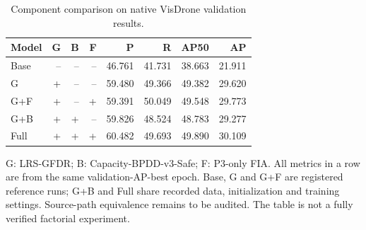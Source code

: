 \begin{table}[t]
\centering
\small
\setlength{\tabcolsep}{4pt}
\caption{Component comparison on native VisDrone validation results.}
\label{tab:selected-2}
\begin{tabular}{lrrrrrrr}
\toprule
Model & G & B & F & P & R & AP50 & AP \\
\midrule
Base & -- & -- & -- & 46.761 & 41.731 & 38.663 & 21.911 \\
G & + & -- & -- & 59.480 & 49.366 & 49.382 & 29.620 \\
G+F & + & -- & + & 59.391 & 50.049 & 49.548 & 29.773 \\
G+B & + & + & -- & 59.826 & 48.524 & 48.783 & 29.277 \\
Full & + & + & + & 60.482 & 49.693 & 49.890 & 30.109 \\
\bottomrule
\end{tabular}
\par\smallskip
\begin{minipage}{0.97\textwidth}\footnotesize G: LRS-GFDR; B: Capacity-BPDD-v3-Safe; F: P3-only FIA. All metrics in a row are from the same validation-AP-best epoch. Base, G and G+F are registered reference runs; G+B and Full share recorded data, initialization and training settings. Source-path equivalence remains to be audited. The table is not a fully verified factorial experiment.\end{minipage}
\par\medskip
\end{table}
